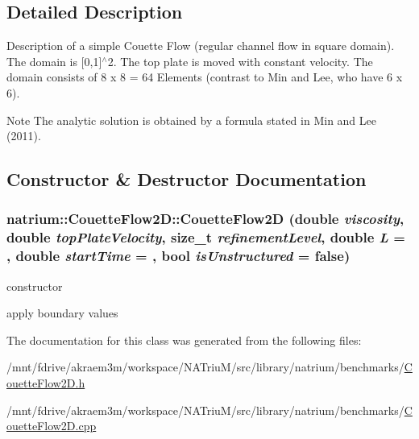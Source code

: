 \subsection{Detailed Description}
Description of a simple Couette Flow (regular channel flow in square domain). The domain is \mbox{[}0,1\mbox{]}$^\wedge$2. The top plate is moved with constant velocity. The domain consists of 8 x 8 = 64 Elements (contrast to Min and Lee, who have 6 x 6). \begin{DoxyNote}{Note}
The analytic solution is obtained by a formula stated in Min and Lee (2011). 
\end{DoxyNote}


\subsection{Constructor \& Destructor Documentation}
\hypertarget{classnatrium_1_1CouetteFlow2D_a94e51b7eaff3998383f1d7dc07b994cb}{
\subsubsection[{CouetteFlow2D}]{\setlength{\rightskip}{0pt plus 5cm}natrium::CouetteFlow2D::CouetteFlow2D (double {\em viscosity}, \/  double {\em topPlateVelocity}, \/  size\_\-t {\em refinementLevel}, \/  double {\em L} = {}, \/  double {\em startTime} = {}, \/  bool {\em isUnstructured} = {\ttfamily false})}}
\label{classnatrium_1_1CouetteFlow2D_a94e51b7eaff3998383f1d7dc07b994cb}


constructor 

apply boundary values 

The documentation for this class was generated from the following files:\begin{DoxyCompactItemize}
\item 
/mnt/fdrive/akraem3m/workspace/NATriuM/src/library/natrium/benchmarks/\hyperlink{CouetteFlow2D_8h}{CouetteFlow2D.h}\item 
/mnt/fdrive/akraem3m/workspace/NATriuM/src/library/natrium/benchmarks/\hyperlink{CouetteFlow2D_8cpp}{CouetteFlow2D.cpp}\end{DoxyCompactItemize}

